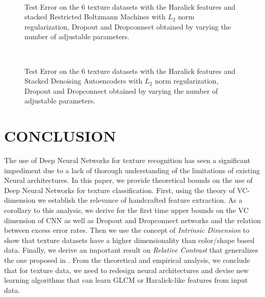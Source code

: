 \documentclass[11pt,a4paper]{article}
\begin{document}
\begin{figure*}[h!]
  \centering
  \\
 \caption{Test Error on the 6 texture datasets with the Haralick features and stacked Restricted Boltzmann Machines with $L_2$ norm regularization, Dropout and Dropconnect obtained by varying the number of adjustable parameters.}\label{experiments_DBN}
\end{figure*}
\begin{figure*}[h!]
  \centering
  \\
\caption{Test Error on the 6 texture datasets with the Haralick features and Stacked Denoising Autoencoders with $L_2$ norm regularization, Dropout and Dropconnect obtained by varying the number of adjustable parameters.} \label{experiments_SAE}
\end{figure*}  

\section{CONCLUSION}
The use of Deep Neural Networks for texture recognition has seen a significant impediment due to a lack of thorough understanding of the limitations of existing Neural architectures. In this paper, we provide theoretical bounds on the use of Deep Neural Networks for texture classification. First, using the theory of VC-dimension we establish the relevance of handcrafted feature extraction. As a corollary to this analysis, we derive for the first time upper bounds on the VC dimension of CNN as well as Dropout and Dropconnect networks and the relation between excess error rates. Then we use the concept of \emph{Intrinsic Dimension} to show that texture datasets have a higher dimensionality than color/shape based data.  Finally, we derive an important result on \emph{Relative Contrast} that generalizes the one proposed in \cite{Aggarwal01}. From the theoretical and empirical analysis, we conclude that for texture data, we need to redesign neural architectures and devise new learning algorithms that can learn GLCM or Haralick-like features from input data.
\clearpage  
\end{document}
